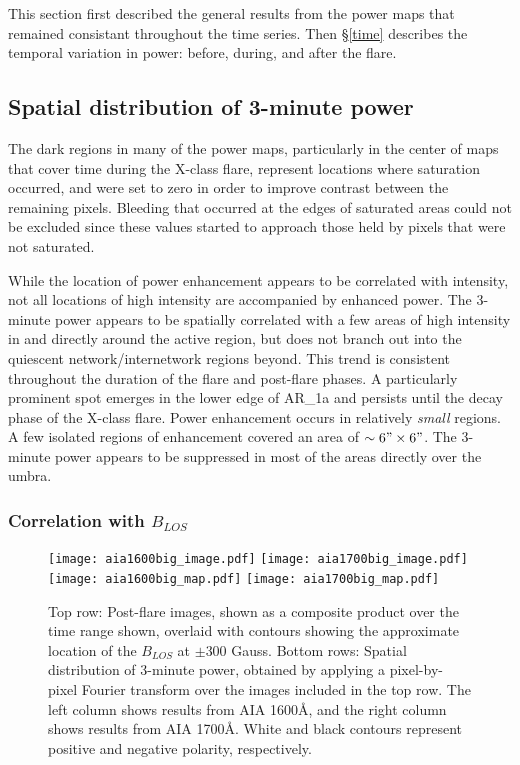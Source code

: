 This section first described the general results from the power
maps that remained consistant throughout the time series.
Then \S\ref{time} describes the temporal variation in power:
before, during, and after the flare.

\subsection{Spatial distribution of 3-minute power}

The dark regions in many of the power maps, particularly
in the center of maps that cover time during the X-class flare,
represent locations where saturation occurred, and were set to
zero in order to improve contrast between the remaining pixels.
Bleeding that occurred at the edges of saturated areas could not
be excluded since these values started to approach those held
by pixels that were not saturated.

While the location of power enhancement appears to be correlated with
intensity, not all locations of high intensity are accompanied by
enhanced power.
The 3-minute power appears to be spatially correlated with a few
areas of high intensity in and
directly around the active region, but does not branch out into the quiescent
network/internetwork regions beyond.
This trend is consistent throughout the duration of the flare and post-flare
phases.
A particularly prominent spot emerges in the lower edge of AR\_1a
and persists until the decay phase of the X-class flare.
Power enhancement occurs in relatively \emph{small} regions.
A few isolated regions of enhancement covered an area of
$\sim 6" \times 6"$.
The 3-minute power appears to be suppressed in most of the areas
directly over the umbra.


\subsubsection{Correlation with $B_{LOS}$}

\begin{figure*}[htb!]\centering
    \texttt{[image: aia1600big\_image.pdf]}
    \texttt{[image: aia1700big\_image.pdf]}\\
    \texttt{[image: aia1600big\_map.pdf]}
    \texttt{[image: aia1700big\_map.pdf]}
    \caption{%
        Top row:
        Post-flare images, shown as a composite product over
        the time range shown, overlaid with contours showing the approximate
        location of the $B_{LOS}$ at $\pm$300 Gauss.
        Bottom rows: Spatial distribution of 3-minute power, obtained
        by applying a pixel-by-pixel Fourier transform over the images
        included in the top row.
        The left column shows results from AIA 1600\AA{}, and
        the right column shows results from AIA 1700\AA{}.
        White and black contours represent positive and negative polarity,
        respectively.
    \label{contours}}
\end{figure*}

